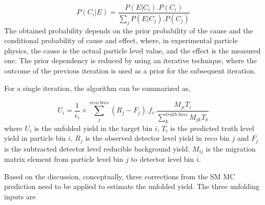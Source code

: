 \begin{equation}
P(C_{i}|E) = \frac{ P(E|C_{i}) . P(C_{i}) } { \sum_{j}{ P(E|C_{j}).P(C_{j}) } }
\label{eqn:BayesTheorem}
\end{equation}
The obtained probability depends on the prior probability of the cause and the conditional probability of cause and effect, where, in experimental particle physics, the cause is the actual particle level value, and the effect is the measured one. The prior dependency is reduced by using an iterative technique, where the outcome of the previous iteration is used as a prior for the subsequent iteration.

For a single iteration, the algorithm can be summarized as, 

\begin{equation}
    U_{i} = \frac{1}{ \epsilon_{i} } \times \sum^{reco~bins}_{j}{ (R_j -F_j ) . f_{i} . \frac{M_{ji} T_{i}}{ \sum_{k}^{truth~bins}{M_{jk} T_{k}}} } 
    \label{eqn:BayesianUnfolding}
\end{equation}
where $U_{i}$ is the unfolded yield in the target bin $i$, $T_{i}$ is the predicted truth level yield in particle bin $i$, $R_{j}$ is the observed detector level yield in reco bin $j$ and $F_{j}$ is the subtracted detector level reducible background yield. $M_{ij}$ is the migration matrix element from particle level bin $j$ to detector level bin $i$. 

Based on the discussion, conceptually, three corrections from the SM MC prediction need to be applied to estimate the unfolded yield. The three unfolding inputs are 

